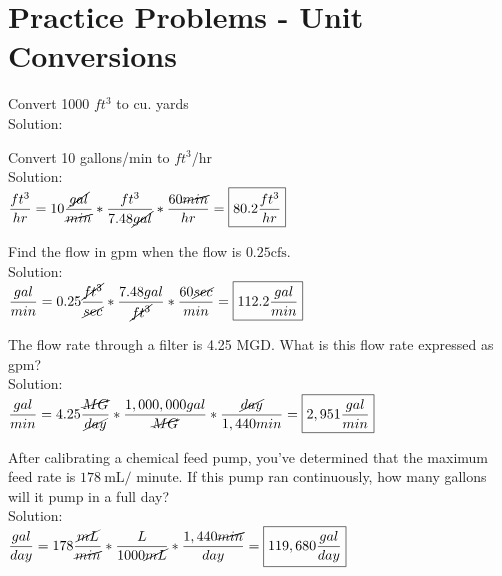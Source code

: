 \section*{Practice Problems - Unit Conversions}

\item Convert 1000 $ft^3$ to cu. yards\\
Solution:\\
\vspace{0.2cm}




\vspace{0.2cm}
\item Convert 10 gallons/min to $ft^3$/hr\\
Solution:\\
\vspace{0.2cm}
$\dfrac{ft^3}{hr}=10\dfrac{\cancel{gal}}{\cancel{min}}*\dfrac{ft^3}{7.48\cancel{gal}}*\dfrac{60\cancel{min}}{hr}=\boxed{80.2 \dfrac{ft^3}{hr}}$

\vspace{0.2cm}
\item Find the flow in gpm when the flow is $0.25 \mathrm{cfs}$.\\
Solution:\\
\vspace{0.2cm}
$\dfrac{gal}{min}=0.25\dfrac{\cancel{ft^3}}{\cancel{sec}}*\dfrac{7.48gal}{\cancel{ft^3}}*\dfrac{60\cancel{sec}}{min}=\boxed{112.2 \dfrac{gal}{min}}$


\vspace{0.2cm}
\item The flow rate through a filter is 4.25 MGD. What is this flow rate expressed as gpm?\\
Solution:\\
\vspace{0.2cm}
$\dfrac{gal}{min}=4.25\dfrac{\cancel{MG}}{\cancel{day}}*\dfrac{1,000,000gal}{\cancel{MG}}*\dfrac{\cancel{day}}{1,440min}=\boxed{2,951 \dfrac{gal}{min}}$

\vspace{0.2cm}
\item After calibrating a chemical feed pump, you've determined that the maximum feed rate is $178 \mathrm{~mL} /$ minute. If this pump ran continuously, how many gallons will it pump in a full day?\\
Solution:\\
\vspace{0.2cm}
$\dfrac{gal}{day}=178\dfrac{\cancel{mL}}{\cancel{min}}*\dfrac{L}{1000\cancel{mL}}*\dfrac{1,440\cancel{min}}{day}=\boxed{119,680 \dfrac{gal}{day}}$


